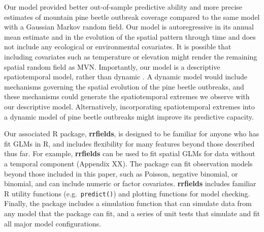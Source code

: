 \documentclass[12pt,english]{article}
\begin{document}
\begin{spacing}{1.9}
Our model provided better out-of-sample predictive ability and more precise
estimates of mountain pine beetle outbreak coverage compared to the same model
with a Gaussian Markov random field. Our model is autoregressive in its annual
mean estimate and in the evolution of the spatial pattern through time and does
not include any ecological or environmental covariates. It is possible that
including covariates such as temperature or elevation might render the remaining
spatial random field as MVN. Importantly, our model is a descriptive
spatiotemporal model, rather than dynamic \citep{cressie2011}. A dynamic model
would include mechanisms governing the spatial evolution of the pine beetle
outbreaks, and these mechanisms could generate the spatiotemporal extremes we
observe with our descriptive model. Alternatively, incorporating spatiotemporal
extremes into a dynamic model of pine beetle outbreaks might improve its
predictive capacity.

Our associated R package, \textbf{rrfields}, is designed to be familiar for
anyone who has fit GLMs in R, and includes flexibility for many features beyond
those described thus far. For example, \textbf{rrfields} can be used to fit
spatial GLMs for data without a temporal component (Appendix XX). The package
can fit observation models beyond those included in this paper, such as Poisson,
negative binomial, or binomial, and can include numeric or factor covariates.
\textbf{rrfields} includes familiar R utility functions (e.g.\
\texttt{predict()}) and plotting functions for model checking. Finally, the
package includes a simulation function that can simulate data from any model
that the package can fit, and a series of unit tests that simulate and fit all
major model configurations.


\end{spacing}
\end{document}
